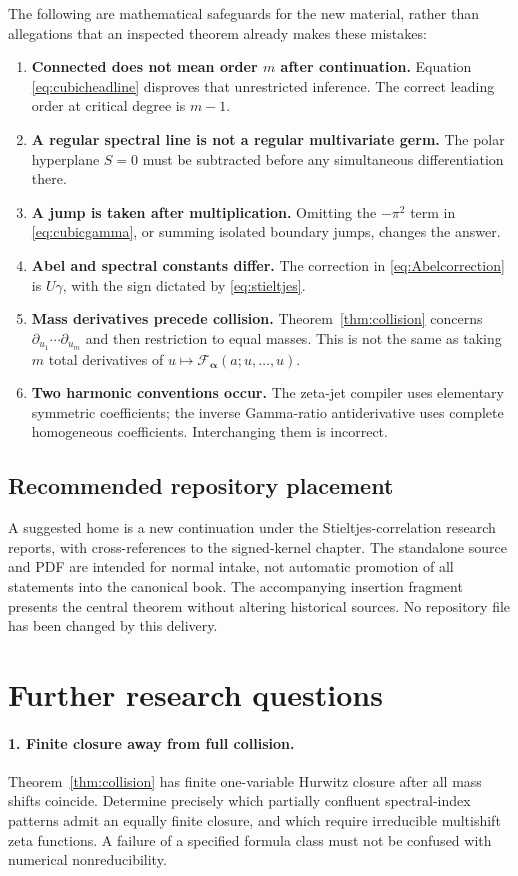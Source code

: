 \documentclass[11pt]{article}
\numberwithin{equation}{section}
\theoremstyle{definition}\newtheorem{definition}[theorem]{Definition}
\theoremstyle{remark}\newtheorem{remark}[theorem]{Remark}
\newcommand{\ba}{\boldsymbol{\alpha}}
\newcommand{\cF}{\mathcal F}
\begin{document}
The following are mathematical safeguards for the new material, rather than allegations that an inspected theorem already makes these mistakes:
\begin{enumerate}[leftmargin=*,itemsep=3pt]
\item \textbf{Connected does not mean order $m$ after continuation.} Equation \eqref{eq:cubicheadline} disproves that unrestricted inference. The correct leading order at critical degree is $m-1$.
\item \textbf{A regular spectral line is not a regular multivariate germ.} The polar hyperplane $S=0$ must be subtracted before any simultaneous differentiation there.
\item \textbf{A jump is taken after multiplication.} Omitting the $-\pi^2$ term in \eqref{eq:cubicgamma}, or summing isolated boundary jumps, changes the answer.
\item \textbf{Abel and spectral constants differ.} The correction in \eqref{eq:Abelcorrection} is $U\gamma$, with the sign dictated by \eqref{eq:stieltjes}.
\item \textbf{Mass derivatives precede collision.} Theorem~\ref{thm:collision} concerns $\partial_{u_1}\cdots\partial_{u_m}$ and then restriction to equal masses. This is not the same as taking $m$ total derivatives of $u\mapsto\cF_{\ba}(a;u,\ldots,u)$.
\item \textbf{Two harmonic conventions occur.} The zeta-jet compiler uses elementary symmetric coefficients; the inverse Gamma-ratio antiderivative uses complete homogeneous coefficients. Interchanging them is incorrect.
\end{enumerate}

\subsection{Recommended repository placement}
A suggested home is a new continuation under the Stieltjes-correlation research reports, with cross-references to the signed-kernel chapter. The standalone source and PDF are intended for normal intake, not automatic promotion of all statements into the canonical book. The accompanying insertion fragment presents the central theorem without altering historical sources. No repository file has been changed by this delivery.

\section{Further research questions}
\paragraph{1. Finite closure away from full collision.}
Theorem~\ref{thm:collision} has finite one-variable Hurwitz closure after all mass shifts coincide. Determine precisely which partially confluent spectral-index patterns admit an equally finite closure, and which require irreducible multishift zeta functions. A failure of a specified formula class must not be confused with numerical nonreducibility.
\end{document}
